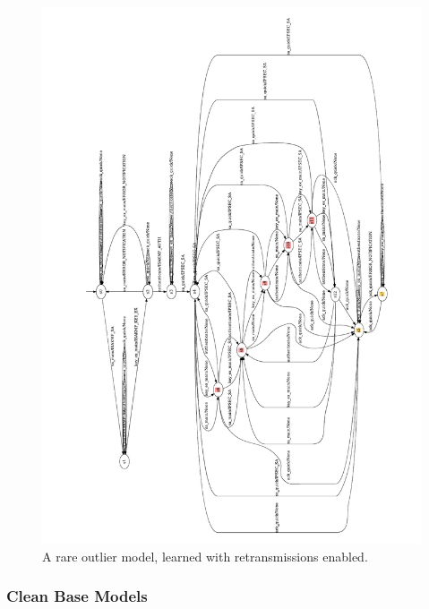\begin{figure}[H]
	\includegraphics[width=\linewidth]{images/models/retransmissions/outlier_rotated}
	\caption{A rare outlier model, learned with retransmissions enabled.}
	\label{fig:ret_out}
\end{figure}


\subsubsection*{Clean Base Models}

